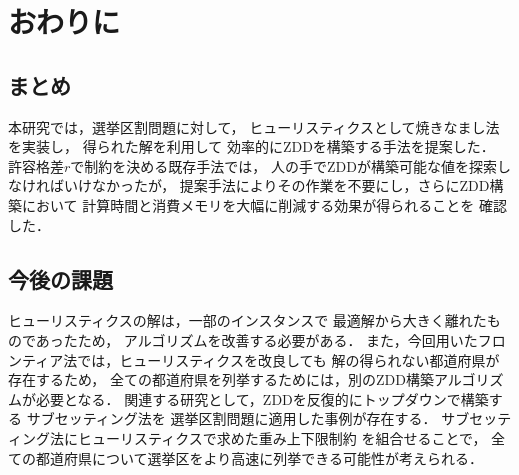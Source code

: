 \chapter{おわりに} \label{chapter:6}
\section{まとめ}
本研究では，選挙区割問題に対して，
ヒューリスティクスとして焼きなまし法を実装し，
得られた解を利用して
効率的にZDDを構築する手法を提案した．
許容格差$r$で制約を決める既存手法では，
人の手でZDDが構築可能な値を探索しなければいけなかったが，
提案手法によりその作業を不要にし，さらにZDD構築において
計算時間と消費メモリを大幅に削減する効果が得られることを
確認した．

\section{今後の課題}
ヒューリスティクスの解は，一部のインスタンスで
最適解から大きく離れたものであったため，
アルゴリズムを改善する必要がある．
また，今回用いたフロンティア法では，ヒューリスティクスを改良しても
解の得られない都道府県が存在するため，
全ての都道府県を列挙するためには，別のZDD構築アルゴリズムが必要となる．
関連する研究として，ZDDを反復的にトップダウンで構築する
サブセッティング法\cite{iwashita}を
選挙区割問題に適用した事例\cite{yamazaki}が存在する．
サブセッティング法にヒューリスティクスで求めた重み上下限制約
を組合せることで，
全ての都道府県について選挙区をより高速に列挙できる可能性が考えられる．
